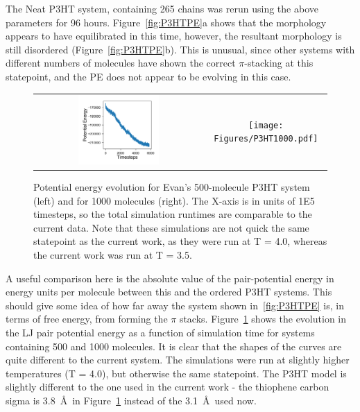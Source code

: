 \documentclass[12pt]{article}
\begin{document}
The Neat P3HT system, containing 265 chains was rerun using the above parameters for 96 hours.
Figure~\ref{fig:P3HTPE}a shows that the morphology appears to have equilibrated in this time, however, the resultant morphology is still disordered (Figure~\ref{fig:P3HTPE}b).
This is unusual, since other systems with different numbers of molecules have shown the correct $\pi$-stacking at this statepoint, and the PE does not appear to be evolving in this case.


\begin{figure}[h!]\centering
    \begin{tabular}{cc}
        \includegraphics[width=0.5\textwidth]{Figures/P3HT500.pdf}&
	    \texttt{[image: Figures/P3HT1000.pdf]}
    \end{tabular}
    \caption{Potential energy evolution for Evan's 500-molecule P3HT system (left) and for 1000 molecules (right).
    The X-axis is in units of 1E5 timesteps, so the total simulation runtimes are comparable to the current data.
    Note that these simulations are not quick the same statepoint as the current work, as they were run at T = 4.0, whereas the current work was run at T = 3.5.}
	\label{fig:P3HTPEs}
\end{figure}


A useful comparison here is the absolute value of the pair-potential energy in energy units per molecule between this and the ordered P3HT systems.
This should give some idea of how far away the system shown in~\ref{fig:P3HTPE} is, in terms of free energy, from forming the $\pi$ stacks.
Figure~\ref{fig:P3HTPEs} shows the evolution in the LJ pair potential energy as a function of simulation time for systems containing 500 and 1000 molecules.
It is clear that the shapes of the curves are quite different to the current system.
The simulations were run at slightly higher temperatures (T = 4.0), but otherwise the same statepoint.
The P3HT model is slightly different to the one used in the current work - the thiophene carbon sigma is 3.8~\AA~in Figure~\ref{fig:P3HTPEs} instead of the 3.1~\AA~used now.
\end{document}

